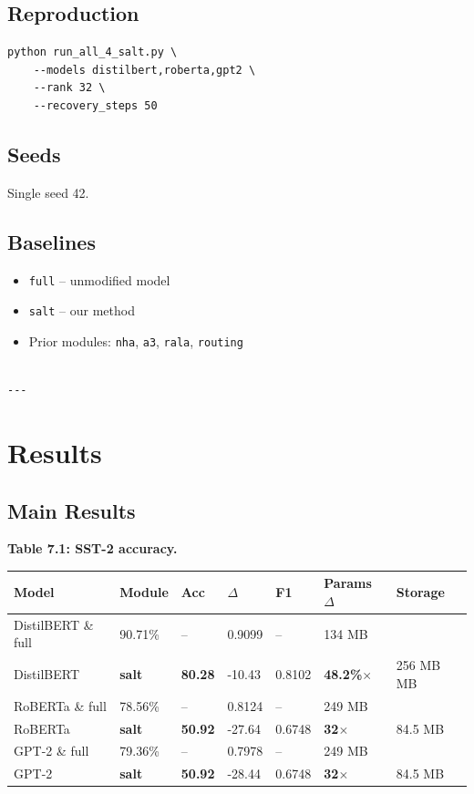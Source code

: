 \subsection{Reproduction}

\begin{lstlisting}
python run_all_4_salt.py \
    --models distilbert,roberta,gpt2 \
    --rank 32 \
    --recovery_steps 50
\end{lstlisting}

\subsection{Seeds}

Single seed 42.

\subsection{Baselines}

\begin{itemize}
\item \texttt{full} -- unmodified model
\item \texttt{salt} -- our method
\item Prior modules: \texttt{nha}, \texttt{a3}, \texttt{rala}, \texttt{routing}
\end{itemize}
\begin{lstlisting}

---
\end{lstlisting}


\section{Results}

\subsection{Main Results}

\textbf{Table 7.1: SST-2 accuracy.}

\begin{table}[H]
\centering
\small
\begin{tabular}{lllllll}
\toprule
\textbf{Model} & \textbf{Module} & \textbf{Acc} & \textbf{$\Delta$} & \textbf{F1} & \textbf{Params $\Delta$} & \textbf{Storage} \\
\midrule
DistilBERT \& full & 90.71\% & -- & 0.9099 & -- & 134 MB \\
DistilBERT & \textbf{salt} & \textbf{80.28} & -10.43 & 0.8102 & \textbf{48.2\%$\times$} & 256 MB MB \\
RoBERTa \& full & 78.56\% & -- & 0.8124 & -- & 249 MB \\
RoBERTa & \textbf{salt} & \textbf{50.92} & -27.64 & 0.6748 & \textbf{32$\times$} & 84.5 MB \\
GPT-2 \& full & 79.36\% & -- & 0.7978 & -- & 249 MB \\
GPT-2 & \textbf{salt} & \textbf{50.92} & -28.44 & 0.6748 & \textbf{32$\times$} & 84.5 MB \\
\bottomrule
\end{tabular}
\end{table}

